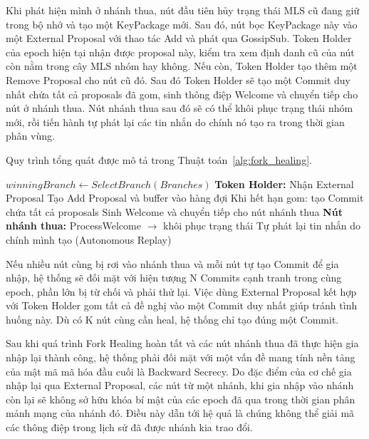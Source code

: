 \documentclass[../DoAn.tex]{subfiles}
\begin{document}
Khi phát hiện mình ở nhánh thua, nút đầu tiên hủy trạng thái MLS cũ đang giữ trong bộ nhớ và tạo một KeyPackage mới. Sau đó, nút bọc KeyPackage này vào một External Proposal với thao tác Add và phát qua GossipSub. Token Holder của epoch hiện tại nhận được proposal này, kiểm tra xem định danh cũ của nút còn nằm trong cây MLS nhóm hay không. Nếu còn, Token Holder tạo thêm một Remove Proposal cho nút cũ đó. Sau đó Token Holder sẽ tạo một Commit duy nhất chứa tất cả proposals đã gom, sinh thông điệp Welcome và chuyển tiếp cho nút ở nhánh thua. Nút nhánh thua sau đó sẽ có thể khôi phục trạng thái nhóm mới, rồi tiến hành tự phát lại các tin nhắn do chính nó tạo ra trong thời gian phân vùng.

Quy trình tổng quát được mô tả trong Thuật toán~\ref{alg:fork_healing}.

\begin{algorithm}[htbp]
\SetAlgoLined
{}
\BlankLine
$winningBranch \leftarrow SelectBranch(Branches)$\;
\textbf{Token Holder:}\;
Nhận External Proposal\;
Tạo Add Proposal và buffer vào hàng đợi\;
Khi hết hạn gom: tạo Commit chứa tất cả proposals\;
Sinh Welcome và chuyển tiếp cho nút nhánh thua\;
\textbf{Nút nhánh thua:}\;
ProcessWelcome $\rightarrow$ khôi phục trạng thái\;
Tự phát lại tin nhắn do chính mình tạo (Autonomous Replay)\;
\caption{Quy trình Fork Healing ($ForkHealing$)}
\label{alg:fork_healing}
\end{algorithm}

Nếu nhiều nút cùng bị rơi vào nhánh thua và mỗi nút tự tạo Commit để gia nhập, hệ thống sẽ đối mặt với hiện tượng N Commits cạnh tranh trong cùng epoch, phần lớn bị từ chối và phải thử lại. Việc dùng External Proposal kết hợp với Token Holder gom tất cả đề nghị vào một Commit duy nhất giúp tránh tình huống này. Dù có K nút cùng cần heal, hệ thống chỉ tạo đúng một Commit.

Sau khi quá trình Fork Healing hoàn tất và các nút nhánh thua đã thực hiện gia nhập lại thành công, hệ thống phải đối mặt với một vấn đề mang tính nền tảng của mật mã mã hóa đầu cuối là Backward Secrecy. Do đặc điểm của cơ chế gia nhập lại qua External Proposal, các nút từ một nhánh, khi gia nhập vào nhánh còn lại sẽ không sở hữu khóa bí mật của các epoch đã qua trong thời gian phân mảnh mạng của nhánh đó. Điều này dẫn tới hệ quả là chúng không thể giải mã các thông điệp trong lịch sử đã được nhánh kia trao đổi.
\end{document}
